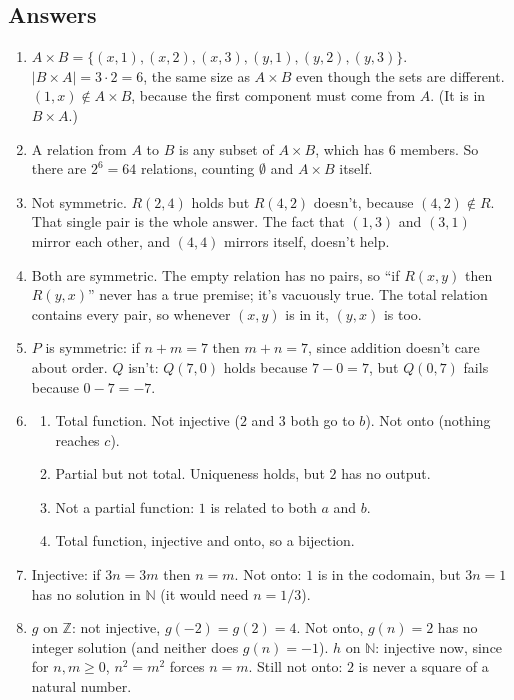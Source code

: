 \subsection{Answers}

\begin{enumerate}
\item $A\times B=\{(x,1),(x,2),(x,3),(y,1),(y,2),(y,3)\}$. $|B\times A|=3\cdot 2=6$, the same size as $A\times B$ even though the sets are different. $(1,x)\notin A\times B$, because the first component must come from $A$. (It is in $B\times A$.)
\item A relation from $A$ to $B$ is any subset of $A\times B$, which has $6$ members. So there are $2^6=64$ relations, counting $\emptyset$ and $A\times B$ itself.
\item Not symmetric. $R(2,4)$ holds but $R(4,2)$ doesn't, because $(4,2)\notin R$. That single pair is the whole answer. The fact that $(1,3)$ and $(3,1)$ mirror each other, and $(4,4)$ mirrors itself, doesn't help.
\item Both are symmetric. The empty relation has no pairs, so ``if $R(x,y)$ then $R(y,x)$'' never has a true premise; it's vacuously true. The total relation contains every pair, so whenever $(x,y)$ is in it, $(y,x)$ is too.
\item $P$ is symmetric: if $n+m=7$ then $m+n=7$, since addition doesn't care about order. $Q$ isn't: $Q(7,0)$ holds because $7-0=7$, but $Q(0,7)$ fails because $0-7=-7$.
\item \begin{enumerate}
\item Total function. Not injective ($2$ and $3$ both go to $b$). Not onto (nothing reaches $c$).
\item Partial but not total. Uniqueness holds, but $2$ has no output.
\item Not a partial function: $1$ is related to both $a$ and $b$.
\item Total function, injective and onto, so a bijection.
\end{enumerate}
\item Injective: if $3n=3m$ then $n=m$. Not onto: $1$ is in the codomain, but $3n=1$ has no solution in $\mathbb{N}$ (it would need $n=1/3$).
\item $g$ on $\mathbb{Z}$: not injective, $g(-2)=g(2)=4$. Not onto, $g(n)=2$ has no integer solution (and neither does $g(n)=-1$). $h$ on $\mathbb{N}$: injective now, since for $n,m\geq 0$, $n^2=m^2$ forces $n=m$. Still not onto: $2$ is never a square of a natural number.

\end{enumerate}

